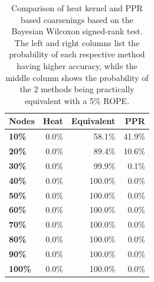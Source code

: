 \begin{table}
  \caption{Comparison of heat kernel and PPR based coarsenings based on the Bayesian Wilcoxon signed-rank test. The left and right columns list the probability of each respective method having higher accuracy, while the middle column shows the probability of the 2 methods being practically equivalent with a 5\% ROPE.}
  \label{tab:bayesian-heat-ppr}
  \centering
  \begin{tabular}{lrrr}
    \toprule
    \textbf{Nodes} & \textbf{Heat} & \textbf{Equivalent} & \textbf{PPR} \\
    \midrule
    \textbf{10\%}  & 0.0\%         & 58.1\%            & 41.9\%         \\
    \textbf{20\%}  & 0.0\%         & 89.4\%            & 10.6\%         \\
    \textbf{30\%}  & 0.0\%         & 99.9\%            & 0.1\%         \\
    \textbf{40\%}  & 0.0\%         & 100.0\%           & 0.0\%          \\
    \textbf{50\%}  & 0.0\%         & 100.0\%           & 0.0\%          \\
    \textbf{60\%}  & 0.0\%         & 100.0\%           & 0.0\%          \\
    \textbf{70\%}  & 0.0\%         & 100.0\%           & 0.0\%          \\
    \textbf{80\%}  & 0.0\%         & 100.0\%           & 0.0\%          \\
    \textbf{90\%}  & 0.0\%         & 100.0\%           & 0.0\%          \\
    \textbf{100\%} & 0.0\%         & 100.0\%           & 0.0\%          \\
    \bottomrule
  \end{tabular}
\end{table}
